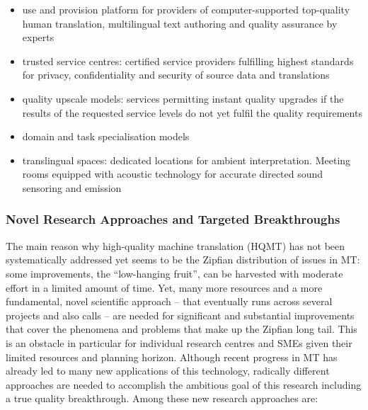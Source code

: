 \documentclass[10pt, plain]{../../metanetpaper}
\begin{document}
\begin{multicols}{2}
\begin{itemize}
\item use and provision platform for providers of computer-supported top-quality human translation, multilingual text authoring and quality assurance by experts
\item trusted service centres: certified service providers fulfilling highest standards for privacy, confidentiality and security of source data and translations
\item quality upscale models: services permitting instant quality upgrades if the results of the requested service levels do not yet fulfil the quality requirements
\item domain and task specialisation models
\item translingual spaces: dedicated locations for ambient interpretation. Meeting rooms equipped with acoustic technology for accurate directed sound sensoring and emission
\end{itemize}

\subsubsection{Novel Research Approaches and Targeted Breakthroughs}
\label{sec:novel-rese-appr-pt1}

The main reason why high-quality machine translation (HQMT) has not been systematically addressed yet seems to be the Zipfian distribution of issues in MT: some improvements, the “low-hanging fruit”, can be harvested with moderate effort in a limited amount of time. Yet, many more resources and a more fundamental, novel scientific approach -- that eventually runs across several projects and also calls -- are needed for significant and substantial improvements that cover the phenomena and problems that make up the Zipfian long tail. This is an obstacle in particular for individual research centres and SMEs given their limited resources and planning horizon. Although recent progress in MT has already led to many new applications of this technology, radically different approaches are needed to accomplish the ambitious goal of this research including a true quality breakthrough. Among these new research approaches are:


\end{multicols}
\end{document}
